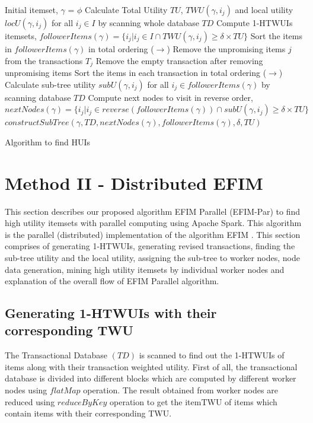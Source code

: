\documentclass[11pt,openright]{report}
\begin{document}
{\SetAlgoNoLine
	\begin{algorithm}
		
		Initial itemset, $\gamma$ = $\phi$\;
		Calculate Total Utility $TU$, $TWU(\gamma, i_j)$ and local utility $locU(\gamma, i_j)$ for all $i_j \in I$ by scanning whole database $TD$\;
		Compute 1-HTWUIs itemsets, \newline $followerItems(\gamma) = \{i_j | i_j \in I \cap TWU(\gamma, i_j) \ge \delta \times TU\}$ \newline
		Sort the items in $followerItems(\gamma)$ in total ordering ($\rightarrow$)\;
		Remove the unpromising items $j$ from the transactions $T_j$\;
		Remove the empty transaction after removing unpromising items\;
		Sort the items in each transaction in total ordering ($\rightarrow$)\;
		Calculate sub-tree utility $subU(\gamma, i_j)$ for all $i_j \in followerItems(\gamma)$ by scanning database $TD$\;
		Compute next nodes to visit in reverse order, \newline $nextNodes(\gamma) = \{i_j|i_j \in reverse(followerItems(\gamma)) \cap subU(\gamma, i_j) \ge \delta \times TU \}$\;
		$constructSubTree(\gamma, TD, nextNodes(\gamma), followerItems(\gamma), \delta, TU)$\;
		\caption{Algorithm to find HUIs}       	
		\label{alg:find_huis}
	\end{algorithm}
}

\section{Method II - Distributed EFIM}
This section describes our proposed algorithm EFIM Parallel (EFIM-Par) to find high utility itemsets with parallel computing using Apache Spark. This algorithm is the parallel (distributed) implementation of the algorithm EFIM \cite{Zida2015}. This section comprises of generating 1-HTWUIs, generating revised transactions, finding the sub-tree utility and the local utility, assigning the sub-tree to worker nodes, node data generation, mining high utility itemsets by individual worker nodes and explanation of the overall flow of EFIM Parallel algorithm.

\subsection{Generating 1-HTWUIs with their corresponding TWU} \label{ss:generate_1htwuis}
The Transactional Database $(TD)$ is scanned to find out the 1-HTWUIs of items along with their transaction weighted utility. First of all, the transactional database is divided into different blocks which are computed by different worker nodes using $flatMap$ operation. The result obtained from worker nodes are reduced using $reduceByKey$ operation to get the itemTWU of items which contain items with their corresponding TWU.
\end{document}
